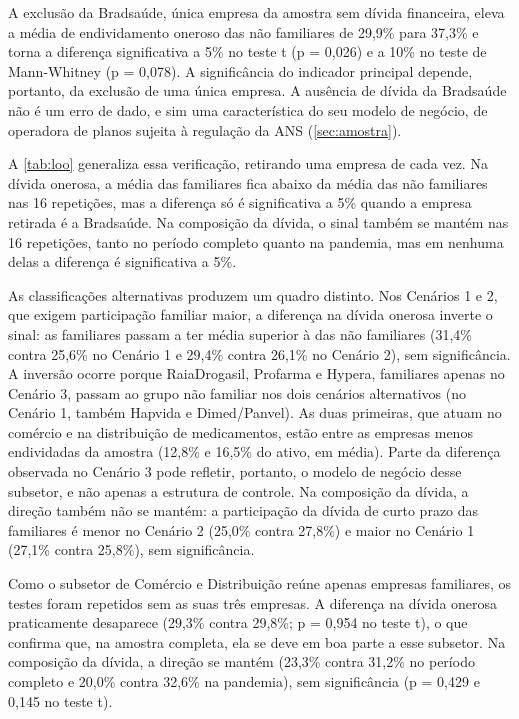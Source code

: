 A exclusão da Bradsaúde, única empresa da amostra sem dívida financeira, eleva a
média de endividamento oneroso das não familiares de 29,9\% para 37,3\% e torna a
diferença significativa a 5\% no teste t (p = 0,026) e a 10\% no teste de
Mann-Whitney (p = 0,078). A significância do indicador principal depende,
portanto, da exclusão de uma única empresa. A ausência de dívida da Bradsaúde não
é um erro de dado, e sim uma característica do seu modelo de negócio, de
operadora de planos sujeita à regulação da ANS (\autoref{sec:amostra}).

A \autoref{tab:loo} generaliza essa verificação, retirando uma empresa de cada
vez. Na dívida onerosa, a média das familiares fica abaixo da média das não
familiares nas 16 repetições, mas a diferença só é significativa a 5\% quando a
empresa retirada é a Bradsaúde. Na composição da dívida, o sinal também se mantém
nas 16 repetições, tanto no período completo quanto na pandemia, mas em nenhuma
delas a diferença é significativa a 5\%.



As classificações alternativas produzem um quadro distinto. Nos Cenários 1 e 2, que
exigem participação familiar maior, a diferença na dívida onerosa inverte o sinal:
as familiares passam a ter média superior à das não familiares (31,4\% contra
25,6\% no Cenário 1 e 29,4\% contra 26,1\% no Cenário 2), sem significância. A
inversão ocorre porque RaiaDrogasil, Profarma e Hypera, familiares apenas no
Cenário 3, passam ao grupo não familiar nos dois cenários alternativos (no Cenário
1, também Hapvida e Dimed/Panvel). As duas primeiras, que atuam no comércio e na
distribuição de medicamentos, estão entre as empresas menos endividadas da amostra
(12,8\% e 16,5\% do ativo, em média). Parte da diferença observada no Cenário 3
pode refletir, portanto, o modelo de negócio desse subsetor, e não apenas a
estrutura de controle. Na composição da dívida, a direção também não se mantém: a
participação da dívida de curto prazo das familiares é menor no Cenário 2 (25,0\%
contra 27,8\%) e maior no Cenário 1 (27,1\% contra 25,8\%), sem significância.

Como o subsetor de Comércio e Distribuição reúne apenas empresas familiares, os
testes foram repetidos sem as suas três empresas. A diferença na dívida onerosa
praticamente desaparece (29,3\% contra 29,8\%; p = 0,954 no teste t), o que confirma
que, na amostra completa, ela se deve em boa parte a esse subsetor. Na composição
da dívida, a direção se mantém (23,3\% contra 31,2\% no período completo e 20,0\%
contra 32,6\% na pandemia), sem significância (p = 0,429 e 0,145 no teste t).

